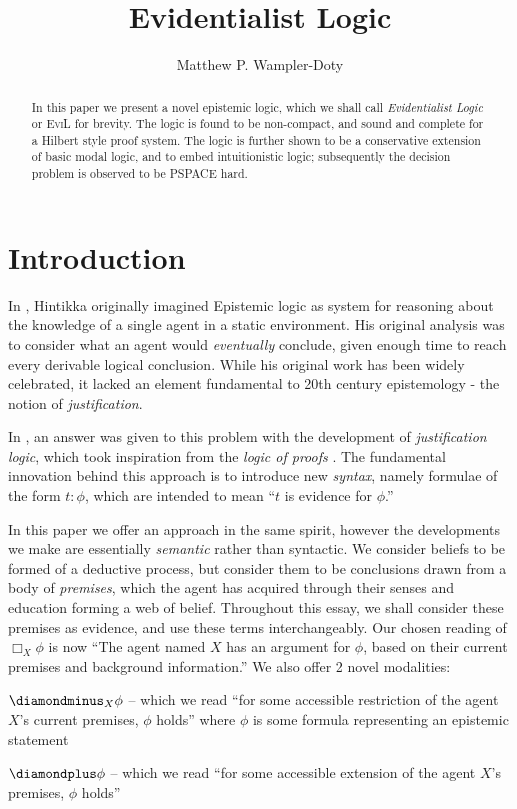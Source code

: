 \documentclass[11pt]{article}
\title{Evidentialist Logic}
\author{Matthew P. Wampler-Doty}
\date{}                                           %
\newcommand{\DD}{\diamondminus}
\newcommand{\DDI}{\diamondplus}
\newcommand{\Nec}{\Box}
\begin{document}
\maketitle
\begin{abstract} In this paper we present a novel epistemic logic, which we shall call \emph{Evidentialist Logic} or \textsc{EviL} for brevity.  The logic is found to be non-compact, and sound and complete for a Hilbert style proof system.  The logic is further shown to be a conservative extension of basic modal logic, and to embed intuitionistic logic; subsequently the decision problem is observed to be \textsf{PSPACE} hard.  
\end{abstract}

\section{Introduction}

In \cite{hintikka1962kab}, Hintikka originally imagined Epistemic logic as system for reasoning about the knowledge of a single agent in a static environment.  His original analysis was to consider what an agent would \emph{eventually} conclude, given enough time to reach every derivable logical conclusion.  While his original work has been widely celebrated, it lacked an element fundamental to 20th century epistemology - the notion of \emph{justification}.

In \cite{artemov2005iji}, an answer was given to this problem with the development of \emph{justification logic}, which took inspiration from the \emph{logic of proofs} \citep{artemov1994lp}.  The fundamental innovation behind this approach is to introduce new \emph{syntax}, namely formulae of the form $t: \phi$, which are intended to mean ``$t$ is evidence for $\phi$.''

In this paper we offer an approach in the same spirit, however the developments we make are essentially \emph{semantic} rather than syntactic.  We consider beliefs to be formed of a deductive process, but consider them to be conclusions drawn from a body of \emph{premises}, which the agent has acquired through their senses and education forming a web of belief.  Throughout this essay, we shall consider these premises as evidence, and use these terms interchangeably.  Our chosen reading of $\Nec_X \phi$ is now ``The agent named $X$ has an argument for $\phi$, based on their current premises and background information.''  We also offer 2 novel modalities:
\begin{bul}
\item $\DD_X \phi$ -- which we read ``for some accessible restriction of the agent $X$'s current premises, $\phi$ holds'' where $\phi$ is some formula representing an epistemic statement
\item $\DDI \phi$ -- which we read ``for some accessible extension of the agent $X$'s premises, $\phi$ holds''
\end{bul}
\end{document}
